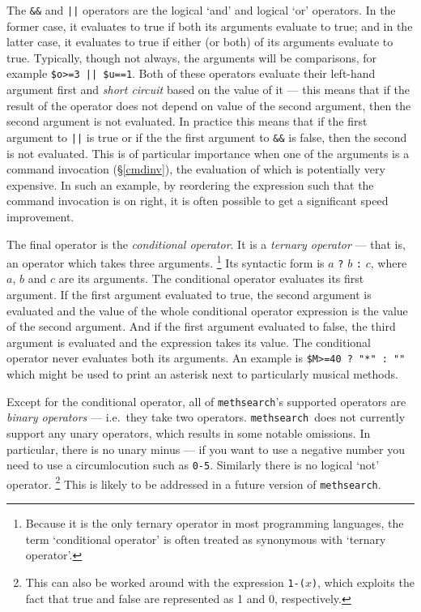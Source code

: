 \documentclass[a4paper,11pt,oneside]{book}
\def\textitidx#1{\textit{#1}\index{#1}}
\def\methsearch{\texttt{meth\-search}}
\newcommand{\sref}[1]{\hyperref[#1]{\S\ref{#1}}}
\begin{document}
The \verb+&&+ and \verb+||+ operators are the logical `and' and logical `or'
operators.  
In the former case, it evaluates to true if both its arguments 
evaluate to true; and in the latter case, it evaluates to true if either 
(or both) of its arguments evaluate to true.  Typically, though not always, 
the arguments will be comparisons, for example \texttt{\$o>=3 || \$u==1}.
Both of these operators evaluate their left-hand argument first and 
\textit{short circuit} 
based on the value of it --- this means that if
the result of the operator does not depend on value of the second argument,
then the second argument is not evaluated.  In practice this means that if
the first argument to \verb+||+ is true or if the 
the first argument to \verb+&&+ is false, then the second is not evaluated.
This is of particular importance when one of the arguments is a command
invocation (\sref{cmdinv}), the evaluation of which is potentially very
expensive. In such an example, by reordering the expression such that the
command invocation is on right, it is often possible to get a significant
speed improvement.

The final operator is the \textitidx{conditional operator}.  It is a 
\textit{ternary operator} --- 
that is, an operator which takes three arguments.%
\footnote{Because it is the only ternary operator in most
programming languages, the term `conditional operator' is often treated
as synonymous with `ternary operator'.}  Its syntactic form is 
$a$ \verb+?+ $b$ \verb+:+ $c$, where $a$, $b$ and $c$ are its arguments.
The conditional operator evaluates its first argument.  If the first
argument evaluated to true, the second argument is evaluated and the
value of the whole conditional operator expression is the value of the 
second argument.  And if the first argument evaluated to false, the third
argument is evaluated and the expression takes its value.  The conditional
operator never evaluates both its arguments.  An example is 
\verb+$M>=40 ? "*" : ""+ which might be used to print an asterisk next
to particularly musical methods.

Except for the conditional operator, all of \methsearch's supported operators
are \textit{binary operators} 
--- i.e.\ they take two operators.  
\methsearch\ does not currently support any unary operators,%
 which results in
some notable omissions.   In particular, there is no unary 
minus --- if you want to use a negative 
number you need to use a circumlocution such as \verb+0-5+.  
Similarly there is no logical `not' operator.%
\footnote{This can also be worked around with the expression 
\verb+1-(+$x$\verb+)+, which exploits the fact that true and false are
represented as 1 and 0, respectively.}
This is likely to be addressed in a future version of \methsearch.
\end{document}
